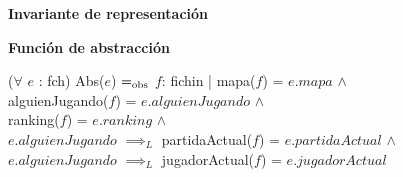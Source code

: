\documentclass[10pt, a4paper]{article}
\begin{document}
    \textbf{Invariante de representación}



    \textbf{Función de abstracción}

        ($\forall$ $e$ : fch) Abs($e$) $=_{\mathrm{obs}}$ $f$: fichin | mapa($f$) = $e.mapa$ $\wedge$ \\
            \text{}\quad\qquad alguienJugando($f$) = $e.alguienJugando$ $\wedge$ \\
            \text{}\quad\qquad ranking($f$) = $e.ranking$ $\wedge$ \\
            \text{}\quad\qquad $e.alguienJugando$ $\implies_L$ partidaActual($f$) = $e.partidaActual$ $\wedge$ \\
            \text{}\quad\qquad $e.alguienJugando$ $\implies_L$ jugadorActual($f$) = $e.jugadorActual$
\end{document}
